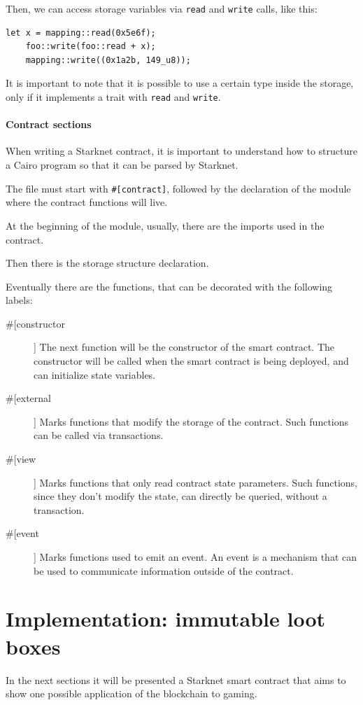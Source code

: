 \documentclass[12pt]{article}
\begin{document}
Then, we can access storage variables via \verb|read| and \verb|write| calls, like this:
\begin{lstlisting}[language=cairo]
    let x = mapping::read(0x5e6f);
    foo::write(foo::read + x);
    mapping::write((0x1a2b, 149_u8));
\end{lstlisting}

It is important to note that it is possible to use a certain type inside the storage, only if it implements a trait with \verb|read| and \verb|write|.

\subsection{Contract sections} \label{subsection:contract_labels}
When writing a Starknet contract, it is important to understand how to structure a Cairo program so that it can be parsed by Starknet.

The file must start with \verb|#[contract]|, followed by the declaration of the module where the contract functions will live.

At the beginning of the module, usually, there are the imports used in the contract.

Then there is the storage structure declaration.

Eventually there are the functions, that can be decorated with the following labels:
\begin{description}
    \item[\#[constructor]] The next function will be the constructor of the smart contract. The constructor will be called when the smart contract is being deployed, and can initialize state variables.
    \item[\#[external]] Marks functions that modify the storage of the contract. Such functions can be called via transactions.
    \item[\#[view]] Marks functions that only read contract state parameters. Such functions, since they don't modify the state, can directly be queried, without a transaction.
    \item[\#[event]] Marks functions used to emit an event. An event is a mechanism that can be used to communicate information outside of the contract.
\end{description}

\newpage
\part{Implementation: immutable loot boxes} \label{part:iilb}
In the next sections it will be presented a Starknet smart contract that aims to show one possible application of the blockchain to gaming.
\end{document}
